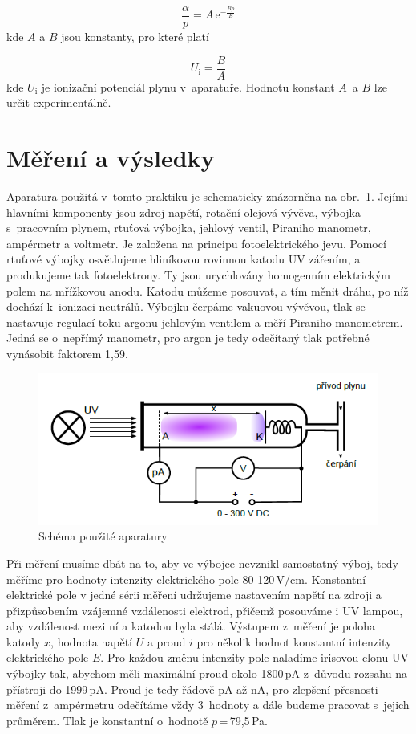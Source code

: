 \documentclass[a4paper,12pt]{article}
\newcommand{\e}{\text{e}}
\begin{document}
\begin{equation}
	\frac{\alpha}{p} = A\,\e^{-\frac{Bp}{E}} 
	\label{5}
\end{equation}
kde $A$ a $B$ jsou konstanty, pro které platí

\begin{equation}
	U_\text{i} = \frac{B}{A}
	\label{6}
\end{equation}
kde $U_\text{i}$ je ionizační potenciál plynu v~aparatuře. Hodnotu konstant $A$~a $B$ 
lze určit experimentálně.

\section{Měření a výsledky}

Aparatura použitá v~tomto praktiku je schematicky znázorněna na 
obr.~\ref{aparatura}. Jejími hlavními komponenty jsou zdroj napětí, rotační 
olejová vývěva, výbojka s~pracovním plynem, rtuťová výbojka, jehlový ventil, Piraniho manometr, ampérmetr a 
voltmetr. Je založena na principu fotoelektrického jevu. Pomocí rtuťové výbojky 
osvětlujeme hliníkovou rovinnou katodu UV zářením, a produkujeme tak 
fotoelektrony. Ty jsou urychlovány homogenním elektrickým polem na mřížkovou 
anodu. Katodu můžeme posouvat, a tím měnit dráhu, po níž dochází k~ionizaci 
neutrálů. Výbojku čerpáme vakuovou vývěvou, tlak 
se nastavuje regulací toku argonu jehlovým ventilem a měří Piraniho manometrem. Jedná se o~nepřímý 
manometr, pro argon je tedy odečítaný tlak potřebné vynásobit 
faktorem 1,59.
\begin{figure}[h]
	\centering
	\includegraphics[width=130mm]{aparatura.png}
	\caption{Schéma použité aparatury}
	\label{aparatura}
\end{figure}

Při měření musíme dbát na to, aby ve výbojce nevznikl samostatný výboj, tedy 
měříme pro hodnoty intenzity elektrického pole 80-120\,$\text{V/cm}$. 
Konstantní elektrické pole v jedné sé\-ri\-i měření udržujeme nastavením napětí 
na 
zdroji a přizpůsobením vzájemné vzdálenosti elektrod, přičemž posouváme i UV 
lampou, aby vzdálenost mezi ní a katodou byla stálá. Výstupem z~měření je 
poloha katody $x$, hodnota napětí $U$ 
a proud $i$ pro několik hodnot konstantní intenzity elektrického pole $E$. Pro 
každou změnu intenzity pole naladíme irisovou clonu UV výbojky tak, abychom 
měli maximální proud okolo 1800\,pA z~důvodu rozsahu na přístroji do 1999\,pA. 
Proud je tedy řádově pA až nA, pro zlepšení přesnosti měření z~ampérmetru 
odečítáme vždy 3~hodnoty a dále budeme pracovat s~jejich průměrem. Tlak je 
konstantní o~hodnotě $p$\,=\,79,5\,Pa.
\end{document}
